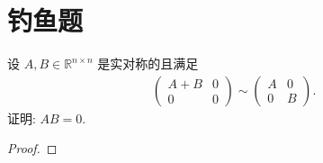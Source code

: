 \documentclass[../../main.tex]{subfiles}
\begin{document}
\section{钓鱼题}

\begin{example}
设 $A, B \in \mathbb{R}^{n \times n}$ 是实对称的且满足
\begin{align*}
\begin{pmatrix}
A + B & 0 \\
0 & 0
\end{pmatrix} \sim 
\begin{pmatrix}
A & 0 \\
0 & B
\end{pmatrix}.
\end{align*}
证明: $AB = 0$.
\end{example}
\begin{proof}

\end{proof}
\end{document}
